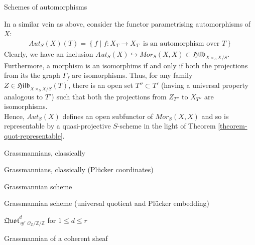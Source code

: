 \documentclass[ignorenonframetext,t]{beamer}
\newcommand{\sO}{{\mathcal O}}
\newcommand{\Z}{{\mathbb Z}}
\theoremstyle{definition}
\begin{document}
\begin{frame}
	Schemes of automorphisms
\end{frame}

\begin{example}
	\label{example-parametrising-automorphisms}
	In a similar vein as above, consider the functor parametrising automorphisms of $X$:
	\begin{align*}
	Aut_S(X)(T)=\left\{f\;|\;f:X_T\rightarrow X_T \;\;\text{is an automorphism over $T$}\right\}
	\end{align*}
	Clearly, we have an inclusion $Aut_S(X)\hookrightarrow Mor_S(X,X)\subset \mathfrak{Hilb}_{X\times_S X/S}$. Furthermore, a morphism is an isomorphims if and only if both the projections from its the graph $\Gamma_f$ are isomorphisms. Thus, for any family $Z\in\mathfrak{Hilb}_{X\times_S X/S}(T)$, there is an open set $T''\subset T'$ (having a universal property analogous to $T'$) such that both the projections from $Z_{T''}$ to $X_{T''}$ are isomorphisms.\\
	Hence, $Aut_S(X)$ defines an open subfunctor of $Mor_S(X,X)$ and so is representable by a quasi-projective $S$-scheme in the light of Theorem \ref{theorem-quot-representable}.
\end{example}


\begin{frame}
	Grassmannians, classically
\end{frame}

\begin{frame}
	Grassmannians, classically (Pl\"{u}cker coordinates)
\end{frame}


\begin{frame}
	Grassmannian scheme
\end{frame}

\begin{frame}
	Grassmannian scheme (universal quotient and Pl\"{u}cker embedding)
\end{frame}

\begin{frame}
	$\mathfrak{Quot}^d_{\oplus^r\sO_\Z/\Z/\Z}$ for $1\leq d\leq r$
\end{frame}

\begin{frame}
	Grassmannian of a coherent sheaf
\end{frame}
\end{document}
